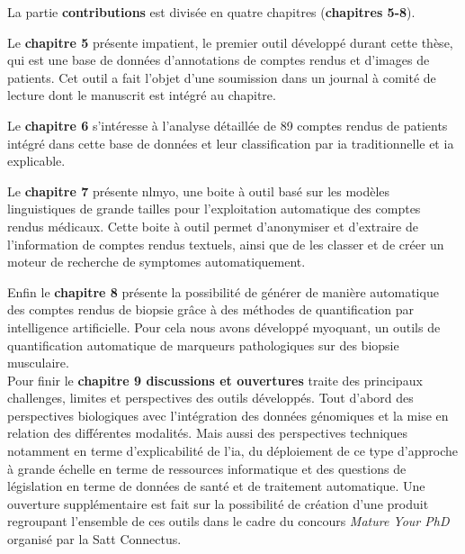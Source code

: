 La partie \textbf{contributions} est divisée en quatre chapitres (\textbf{chapitres 5-8}). 

Le \textbf{chapitre 5 }présente \gls{impatient}, le premier outil développé durant cette thèse, qui est une base de données d'annotations de comptes rendus et d'images de patients. Cet outil a fait l'objet d'une soumission dans un journal à comité de lecture dont le manuscrit est intégré au chapitre. 

Le \textbf{chapitre 6} s'intéresse à l'analyse détaillée de 89 comptes rendus de patients intégré dans cette base de données et leur classification par \gls{ia} traditionnelle et \gls{ia} explicable.

Le \textbf{chapitre 7} présente \gls{nlmyo}, une boite à outil basé sur les modèles linguistiques de grande tailles pour l'exploitation automatique des comptes rendus médicaux. Cette boite à outil permet d'anonymiser et d'extraire de l'information de comptes rendus textuels, ainsi que de les classer et de créer un moteur de recherche de symptomes automatiquement. 

Enfin le \textbf{chapitre 8 }présente la possibilité de générer de manière automatique des comptes rendus de biopsie grâce à des méthodes de quantification par intelligence artificielle. Pour cela nous avons développé \gls{myoquant}, un outils de quantification automatique de marqueurs pathologiques sur des biopsie musculaire. \\


Pour finir le \textbf{chapitre 9 discussions et ouvertures} traite des principaux challenges, limites et perspectives des outils développés. Tout d'abord des perspectives biologiques avec l'intégration des données génomiques et la mise en relation des différentes modalités. Mais aussi des perspectives techniques notamment en terme d'explicabilité de l'\gls{ia}, du déploiement de ce type d'approche à grande échelle en terme de ressources informatique et des questions de législation en terme de données de santé et de traitement automatique. Une ouverture supplémentaire est fait sur la possibilité de création d'une produit regroupant l'ensemble de ces outils dans le cadre du concours \textit{Mature Your PhD} organisé par la Satt Connectus.